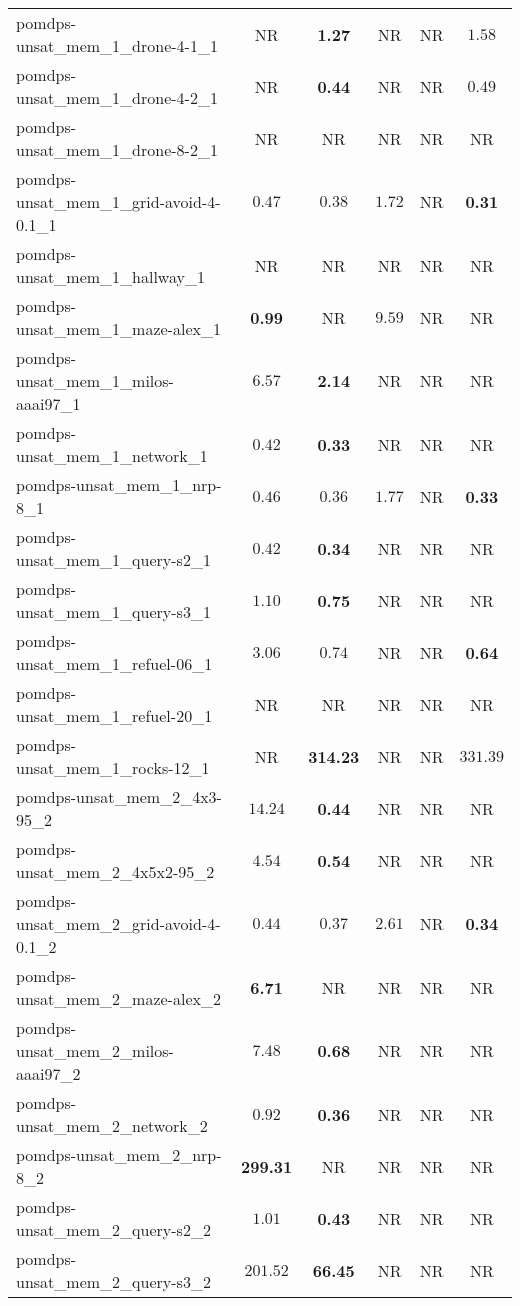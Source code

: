 \begin{tabular}{lccccc}
pomdps-unsat\_mem\_1\_drone-4-1\_1 & NR & \textbf{1.27} & NR & NR & $1.58$ \\
pomdps-unsat\_mem\_1\_drone-4-2\_1 & NR & \textbf{0.44} & NR & NR & $0.49$ \\
pomdps-unsat\_mem\_1\_drone-8-2\_1 & NR & NR & NR & NR & NR \\
pomdps-unsat\_mem\_1\_grid-avoid-4-0.1\_1 & $0.47$ & $0.38$ & $1.72$ & NR & \textbf{0.31} \\
pomdps-unsat\_mem\_1\_hallway\_1 & NR & NR & NR & NR & NR \\
pomdps-unsat\_mem\_1\_maze-alex\_1 & \textbf{0.99} & NR & $9.59$ & NR & NR \\
pomdps-unsat\_mem\_1\_milos-aaai97\_1 & $6.57$ & \textbf{2.14} & NR & NR & NR \\
pomdps-unsat\_mem\_1\_network\_1 & $0.42$ & \textbf{0.33} & NR & NR & NR \\
pomdps-unsat\_mem\_1\_nrp-8\_1 & $0.46$ & $0.36$ & $1.77$ & NR & \textbf{0.33} \\
pomdps-unsat\_mem\_1\_query-s2\_1 & $0.42$ & \textbf{0.34} & NR & NR & NR \\
pomdps-unsat\_mem\_1\_query-s3\_1 & $1.10$ & \textbf{0.75} & NR & NR & NR \\
pomdps-unsat\_mem\_1\_refuel-06\_1 & $3.06$ & $0.74$ & NR & NR & \textbf{0.64} \\
pomdps-unsat\_mem\_1\_refuel-20\_1 & NR & NR & NR & NR & NR \\
pomdps-unsat\_mem\_1\_rocks-12\_1 & NR & \textbf{314.23} & NR & NR & $331.39$ \\
pomdps-unsat\_mem\_2\_4x3-95\_2 & $14.24$ & \textbf{0.44} & NR & NR & NR \\
pomdps-unsat\_mem\_2\_4x5x2-95\_2 & $4.54$ & \textbf{0.54} & NR & NR & NR \\
pomdps-unsat\_mem\_2\_grid-avoid-4-0.1\_2 & $0.44$ & $0.37$ & $2.61$ & NR & \textbf{0.34} \\
pomdps-unsat\_mem\_2\_maze-alex\_2 & \textbf{6.71} & NR & NR & NR & NR \\
pomdps-unsat\_mem\_2\_milos-aaai97\_2 & $7.48$ & \textbf{0.68} & NR & NR & NR \\
pomdps-unsat\_mem\_2\_network\_2 & $0.92$ & \textbf{0.36} & NR & NR & NR \\
pomdps-unsat\_mem\_2\_nrp-8\_2 & \textbf{299.31} & NR & NR & NR & NR \\
pomdps-unsat\_mem\_2\_query-s2\_2 & $1.01$ & \textbf{0.43} & NR & NR & NR \\
pomdps-unsat\_mem\_2\_query-s3\_2 & $201.52$ & \textbf{66.45} & NR & NR & NR \\

\end{tabular}
